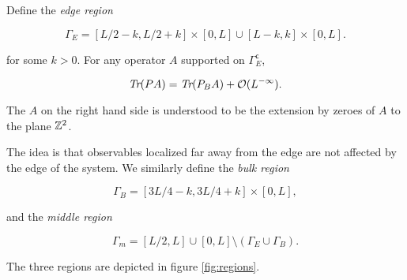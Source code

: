 \documentclass[12pt, letterpaper]{article}
\begin{document}
\begin{assumption}
Define the \emph{edge region }

\[\Gamma_E = [L/2-k,L/2+k]\times [0,L] \cup [L-k,k]\times [0,L].\]

for some $k>0$. For any operator $A$ supported on $\Gamma_E^\mathsf{c}$,

\[\emph{Tr}(PA) = \emph{Tr}(P_BA) + \mathcal{O}(L^{-\infty}).\]

The $A$ on the right hand side is understood to be the extension by zeroes of $A$ to the plane $\mathbb{Z}^2$.
\label{ass:bulk}
\end{assumption}

The idea is that observables localized far away from the edge are not affected by the edge of the system. We similarly define the \emph{bulk region}

\[\Gamma_B = [3L/4-k, 3L/4+k] \times [0,L],\]

and the \emph{middle region}

\[\Gamma_m = [L/2,L]\cup[0,L] \setminus (\Gamma_E \cup \Gamma_B).\]

The three regions are depicted in figure \ref{fig:regions}.
\end{document}
